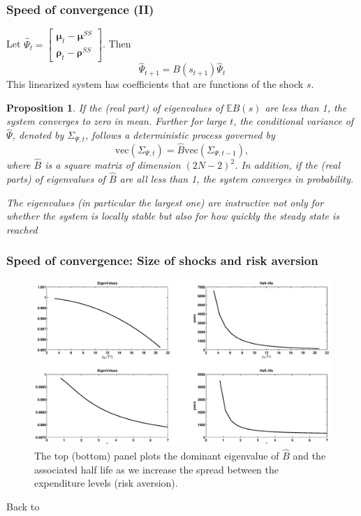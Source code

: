 \documentclass{beamer}
\newcommand{\bmat}{\begin{matrix}}
\newcommand{\emat}{\end{matrix}}
\newtheorem{proposition}{Proposition}
\begin{document}
\begin{frame}
\frametitle{Speed of convergence  (II) }
Let $\hat{\Psi}_{t}= \left[\bmat \bm{\mu}_{t} - \bm{\mu}^{SS}\\ \bm \rho_t - \bm \rho^{SS}\emat\right]$. Then 
\begin{equation*}
 \hat{\Psi}_{t+1}=B(s_{t+1})\hat{\Psi}_t
\end{equation*}
This linearized system has coefficients that are functions of the shock $s$.
\small

\begin{proposition}\label{prop: localstability}
If the (real part) of eigenvalues of $\mathbb{E}B(s)$ are less than 1,  the system  converges to zero  in mean. Further for large $t$, the conditional variance of $\hat{\Psi}$, denoted by $\Sigma_{\Psi,t}$, follows a deterministic process governed by
\[\text{vec}(\Sigma_{\Psi,t})=\hat{B} \text{vec}(\Sigma_{\Psi,t-1}),\]	
where $\hat{B}$ is a square matrix of dimension $(2N-2)^2$. In addition,  if the (real parts) of eigenvalues of $\hat{B}$ are all less than 1, the system converges in probability.
\end{proposition}

\color{red}\emph{The eigenvalues (in particular the largest one) are instructive not only for whether the system is locally stable but also for how quickly the steady state is reached}

\end{frame}

\begin{frame}
\frametitle{Speed of convergence: Size of shocks and risk aversion}
  
  \begin{figure}[htp]
  \tiny 
 \centering
 \includegraphics[width=\textwidth]{Draft25Graphs/eigenvalues.eps}
 \caption{\tiny{The top (bottom) panel plots the dominant eigenvalue of $\hat{B}$ and the associated half life as we increase
the spread between the expenditure levels (risk aversion).}}
 \label{fig: Eigenvalues}
 \end{figure}
 Back to \hyperlink{main}{}
 \end{frame}
 
\end{document}
